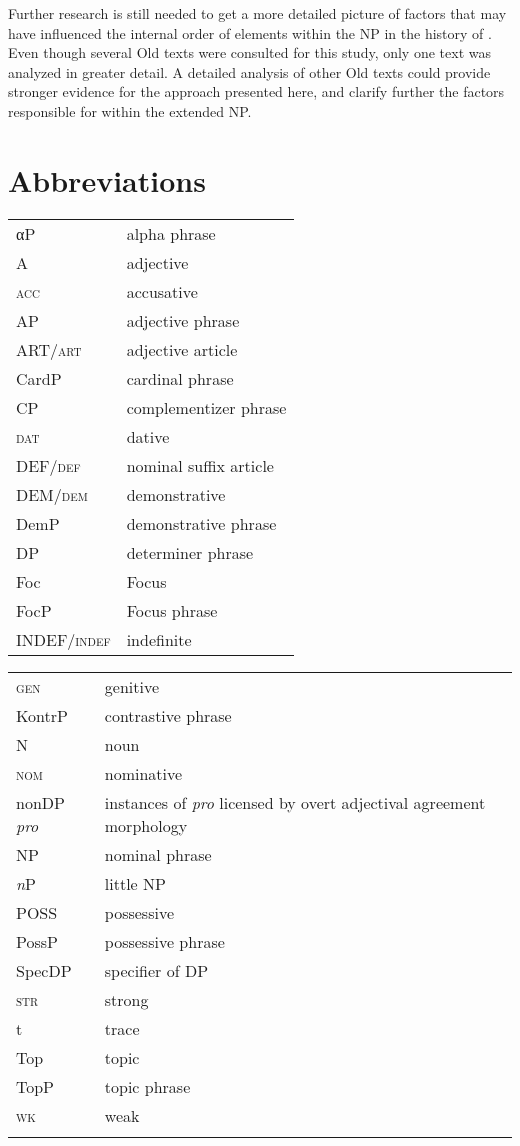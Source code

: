 \documentclass[output=paper,colorlinks,citecolor=brown]{langscibook}
\begin{document}
Further research is still needed to get a more detailed picture of
factors that may have influenced the internal order of elements within
the NP in the history of . Even though several Old 
texts were consulted for this study, only one text was analyzed in
greater detail. A detailed analysis of other Old  texts could
provide stronger evidence for the approach presented here, and clarify
further the factors responsible for   within the
extended NP.


 
\section*{Abbreviations}
\begin{tabularx}{.45\textwidth}{lQ}
αP & alpha phrase\\
A & {adjective}\\
\textsc{acc} & accusative \\
AP & {adjective} phrase\\
ART/\textsc{art} & {adjective} {article}\\
CardP & cardinal phrase\\
CP & complementizer phrase\\
\textsc{dat} & {dative} \\
DEF/\textsc{def} & nominal suffix {article}\\
DEM/\textsc{dem} & {demonstrative}\\
DemP & {demonstrative} phrase\\
DP & {determiner} phrase\\
Foc & Focus\\
FocP & Focus phrase\\
INDEF/\textsc{indef} & {indefinite}\\
\end{tabularx}
\begin{tabularx}{.5\textwidth}{lQ}
\textsc{gen} & {genitive} \\
KontrP & contrastive phrase\\
N & {noun}\\
\textsc{nom} & {nominative} \\
nonDP \textit{pro} & instances of \textit{pro} licensed by overt adjectival {agreement} morphology\\
NP & nominal phrase\\
\textit{n}P & little NP\\
POSS & possessive\\
PossP & possessive phrase\\
SpecDP & specifier of DP\\
\textsc{str} & strong\\
t & trace\\
Top & topic\\
TopP & topic phrase\\
\textsc{wk} & weak\\
\\
\end{tabularx}
\end{document}
